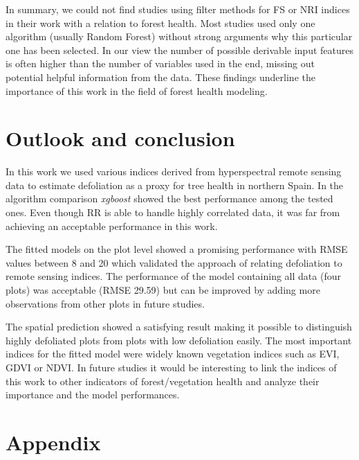 \documentclass[review]{elsarticle}
\begin{document}
In summary, we could not find studies using filter methods for \ac{FS} or \ac{NRI} indices in their work with a relation to forest health.
Most studies used only one algorithm (usually Random Forest) without strong arguments why this particular one has been selected.
In our view the number of possible derivable input features is often higher than the number of variables used in the end, missing out potential helpful information from the data.
These findings underline the importance of this work in the field of forest health modeling.

\section{Outlook and conclusion}

\noindent In this work we used various indices derived from hyperspectral remote sensing data to estimate defoliation as a proxy for tree health in northern Spain.
In the algorithm comparison \textit{xgboost} showed the best performance among the tested ones.
Even though \ac{RR} is able to handle highly correlated data, it was far from achieving an acceptable performance in this work.

The fitted models on the plot level showed a promising performance with RMSE values between 8 and 20 which validated the approach of relating defoliation to remote sensing indices.
The performance of the model containing all data (four plots) was acceptable (RMSE 29.59) but can be improved by adding more observations from other plots in future studies.

The spatial prediction showed a satisfying result making it possible to distinguish highly defoliated plots from plots with low defoliation easily.
The most important indices for the fitted model were widely known vegetation indices such as EVI, GDVI or NDVI.
In future studies it would be interesting to link the indices of this work to other indicators of forest/vegetation health and analyze their importance and the model performances.

\section{Appendix}

\appendix
\gdef\thesection{\Alph{section}} %
\makeatletter
\renewcommand\@seccntformat[1]{Appendix \csname the#1\endcsname.\hspace{0.5em}}
\makeatother
\end{document}
